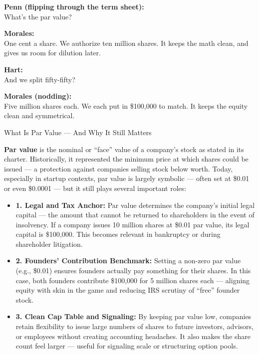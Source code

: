 \medskip


\textbf{Penn (flipping through the term sheet):} \\
What’s the par value?

\textbf{Morales:} \\
One cent a share. We authorize ten million shares. It keeps the math clean, and gives us room for dilution later.

\textbf{Hart:} \\
And we split fifty-fifty?

\textbf{Morales (nodding):} \\
Five million shares each. We each put in \$100,000 to match. It keeps the equity clean and symmetrical.

\begin{TechnicalSidebar}{What Is Par Value — And Why It Still Matters}

  \textbf{Par value} is the nominal or “face” value of a company’s stock as stated in its charter. Historically, it 
  represented the minimum price at which shares could be issued — a protection against companies selling stock below 
  worth. Today, especially in startup contexts, par value is largely symbolic — often set at \$0.01 or even \$0.0001 — 
  but it still plays several important roles:
  
  \medskip

  \begin{itemize}
    \item \textbf{1. Legal and Tax Anchor:}  
    Par value determines the company’s initial legal capital — the amount that cannot be returned to shareholders in the event of insolvency. If a company issues 10 million shares at \$0.01 par value, its legal capital is \$100,000. This becomes relevant in bankruptcy or during shareholder litigation.
    
    \item \textbf{2. Founders’ Contribution Benchmark:}  
    Setting a non-zero par value (e.g., \$0.01) ensures founders actually pay something for their shares. In this case, both founders contribute \$100,000 for 5 million shares each — aligning equity with skin in the game and reducing IRS scrutiny of “free” founder stock.
    
    \item \textbf{3. Clean Cap Table and Signaling:}  
    By keeping par value low, companies retain flexibility to issue large numbers of shares to future investors, advisors, or employees without creating accounting headaches. It also makes the share count feel larger — useful for signaling scale or structuring option pools.
    

\end{itemize}
\end{TechnicalSidebar}
